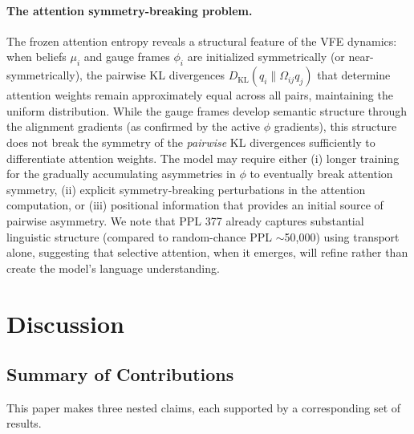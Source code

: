 \documentclass[twoside,11pt]{article}
\begin{document}
\paragraph{The attention symmetry-breaking problem.} The frozen attention entropy reveals a structural feature of the VFE dynamics: when beliefs $\mu_i$ and gauge frames $\phi_i$ are initialized symmetrically (or near-symmetrically), the pairwise KL divergences $D_{\mathrm{KL}}(q_i \| \Omega_{ij} q_j)$ that determine attention weights remain approximately equal across all pairs, maintaining the uniform distribution. While the gauge frames develop semantic structure through the alignment gradients (as confirmed by the active $\phi$ gradients), this structure does not break the symmetry of the \emph{pairwise} KL divergences sufficiently to differentiate attention weights. The model may require either (i) longer training for the gradually accumulating asymmetries in $\phi$ to eventually break attention symmetry, (ii) explicit symmetry-breaking perturbations in the attention computation, or (iii) positional information that provides an initial source of pairwise asymmetry. We note that PPL 377 already captures substantial linguistic structure (compared to random-chance PPL $\sim$50{,}000) using transport alone, suggesting that selective attention, when it emerges, will refine rather than create the model's language understanding.


\section{Discussion}

\subsection{Summary of Contributions}

This paper makes three nested claims, each supported by a corresponding set of results.
\end{document}
